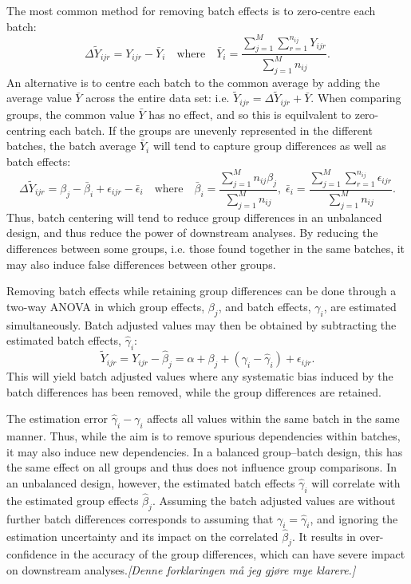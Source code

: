 \documentclass{bio}
\newcommand\COMMENT[2]{\textcolor{COMMENTcol}{#1}\NOTE{#2}}
\newcommand\NB[1]{\textcolor{NBcol}{\textit{#1}}}
\newcommand\NOTE[1]{\NB{[#1]}}
\begin{document}
The most common method for removing batch effects is to zero-centre each batch:
\begin{equation}
\Delta\widetilde Y_{ijr}=Y_{ijr}-\bar{Y}_{i}
\quad\text{where}\quad
\bar{Y}_i=\frac{\sum_{j=1}^M\sum_{r=1}^{n_{ij}} Y_{ijr}}{\sum_{j=1}^M n_{ij}}.
\end{equation}
An alternative is to centre each batch to the common average by adding the average value $\bar{Y}$ across the entire data set: i.e. $\widetilde Y_{ijr}=\Delta\widetilde Y_{ijr}+\bar{Y}$. When comparing groups, the common value $\bar{Y}$ has no effect, and so this is equilvalent to zero-centring each batch. If the groups are unevenly represented in the different batches, the batch average $\bar{Y}_i$ will tend to capture group differences as well as batch effects:
\begin{equation}
\Delta\widetilde{Y}_{ijr}=\beta_j-\bar{\beta}_i+\epsilon_{ijr}-\bar{\epsilon}_i
\quad\text{where}\quad
\bar{\beta}_i=\frac{\sum_{j=1}^M n_{ij}\beta_j}{\sum_{j=1}^M n_{ij}},\;
\bar{\epsilon}_i=\frac{\sum_{j=1}^M\sum_{r=1}^{n_{ij}} \epsilon_{ijr}}{\sum_{j=1}^M n_{ij}}.
\end{equation}
Thus, batch centering will tend to reduce group differences in an unbalanced design, and thus reduce the power of downstream analyses. By reducing the differences between some groups, i.e. those found together in the same batches, it may also induce false differences between other groups.

Removing batch effects while retaining group differences can be done through a two-way ANOVA in which group effects, $\beta_j$, and batch effects, $\gamma_i$, are estimated simultaneously. Batch adjusted values may then be obtained by subtracting the estimated batch effects, $\hat\gamma_i$:
\begin{equation}
\widetilde Y_{ijr}=Y_{ijr}-\hat\beta_j=\alpha+\beta_j+(\gamma_i-\hat\gamma_i)+\epsilon_{ijr}.
\end{equation}
This will yield batch adjusted values where any systematic bias induced by the batch differences has been removed, while the group differences are retained.

The estimation error $\hat\gamma_i-\gamma_i$ affects all values within the same batch in the same manner. Thus, while the aim is to remove spurious dependencies within batches, it may also induce new dependencies. In a balanced group--batch design, this has the same effect on all groups and thus does not influence group comparisons. In an unbalanced design, however, the estimated batch effects $\hat\gamma_i$ will correlate with the estimated group effects $\hat\beta_j$. \COMMENT{Assuming the batch adjusted values are without further batch differences corresponds to assuming that $\gamma_i=\hat\gamma_i$, and ignoring the estimation uncertainty and its impact on the correlated $\hat\beta_j$. It results in over-confidence in the accuracy of the group differences, which can have severe impact on downstream analyses.}{Denne forklaringen må jeg gjøre mye klarere.}
\end{document}
